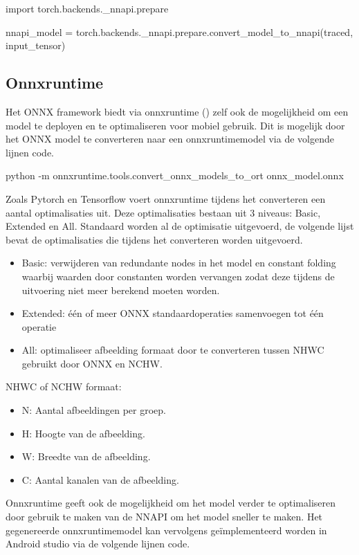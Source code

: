 \begin{python}
import torch.backends._nnapi.prepare

nnapi_model = torch.backends._nnapi.prepare.convert_model_to_nnapi(traced, input_tensor)
\end{python}

\subsection{Onnxruntime}
Het ONNX framework biedt via onnxruntime (\cite{onnx_onnxruntime_2019}) zelf ook de mogelijkheid om een model te deployen en te optimaliseren voor mobiel gebruik.
Dit is mogelijk door het ONNX model te converteren naar een onnxruntimemodel via de volgende lijnen code.

\begin{python}
python -m onnxruntime.tools.convert_onnx_models_to_ort onnx_model.onnx
\end{python}

Zoals Pytorch en Tensorflow voert onnxruntime tijdens het converteren een aantal optimalisaties uit.
Deze optimalisaties bestaan uit 3 niveaus: Basic, Extended en All.
Standaard worden al de optimisatie uitgevoerd, de volgende lijst bevat de optimalisaties die tijdens het converteren worden uitgevoerd.

\begin{itemize}
	\item Basic: verwijderen van redundante nodes in het model en constant folding waarbij waarden door constanten worden vervangen zodat deze tijdens de uitvoering niet meer berekend moeten worden.
	\item Extended: \'e\'en of meer ONNX standaardoperaties samenvoegen tot \'e\'en operatie 
	\item All: optimaliseer afbeelding formaat door te converteren tussen NHWC gebruikt door ONNX en NCHW.
\end{itemize}

NHWC of NCHW formaat: 

\begin{itemize} \label{nhwc}
	\item N: Aantal afbeeldingen per groep.
	\item H: Hoogte van de afbeelding.
	\item W: Breedte van de afbeelding.
	\item C: Aantal kanalen van de afbeelding.
\end{itemize}

Onnxruntime geeft ook de mogelijkheid om het model verder te optimaliseren door gebruik te maken van de NNAPI om het model sneller te maken.
Het gegenereerde onnxruntimemodel kan vervolgens ge\"implementeerd worden in Android studio via de volgende lijnen code.

